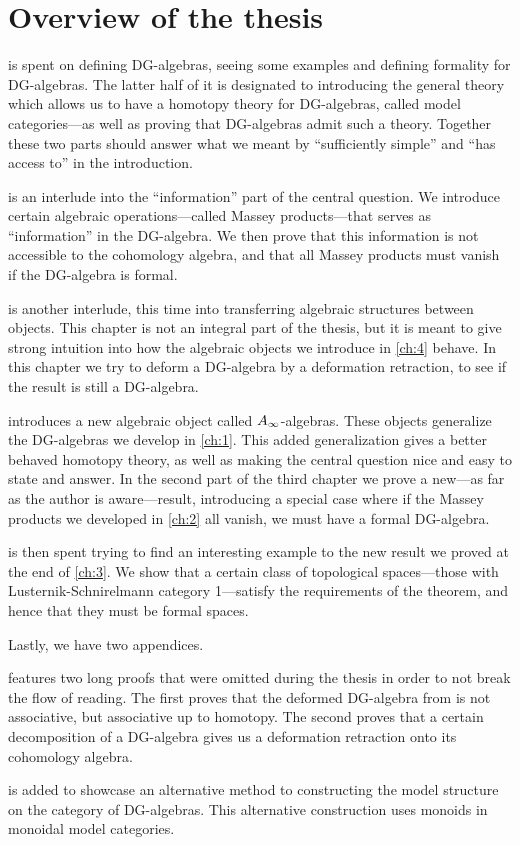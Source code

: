 

\section{Overview of the thesis}

\textit{} is spent on defining DG-algebras, seeing some examples and  defining formality for DG-algebras. The latter half of it is designated to introducing the general theory which allows us to have a homotopy theory for DG-algebras, called model categories---as well as proving that DG-algebras admit such a theory. Together these two parts should answer what we meant by ``sufficiently simple'' and ``has access to'' in the introduction.

\textit{} is an interlude into the ``information'' part of the central question. We introduce certain algebraic operations---called Massey products---that serves as ``information'' in the DG-algebra. We then prove that this information is not accessible to the cohomology algebra, and that all Massey products must vanish if the DG-algebra is formal. 

\textit{} is another interlude, this time into transferring algebraic structures between objects. This chapter is not an integral part of the thesis, but  it is meant to give strong intuition into how the algebraic objects we introduce in \ref{ch:4} behave. In this chapter we try to deform a DG-algebra by a deformation retraction, to see if the result is still a DG-algebra. 

\textit{} introduces a new algebraic object called $A_{\infty}$-algebras. These objects generalize the DG-algebras we develop in \cref{ch:1}. This added generalization gives a better behaved homotopy theory, as well as making the central question nice and easy to state and answer. In the second part of the third chapter we prove a new---as far as the author is aware---result, introducing a special case where if the Massey products we developed in \cref{ch:2} all vanish, we must have a formal DG-algebra. 

\textit{} is then spent trying to find an interesting example to the new result we proved at the end of \cref{ch:3}. We show that a certain class of topological spaces---those with Lusternik-Schnirelmann category 1---satisfy the requirements of the theorem, and hence that they must be formal spaces. 

Lastly, we have two appendices. 

\textit{} features two long proofs that were omitted during the thesis in order to not break the flow of reading. The first proves that the deformed DG-algebra from  is not associative, but associative up to homotopy. The second proves that a certain decomposition of a DG-algebra gives us a deformation retraction onto its cohomology algebra.

\textit{} is added to showcase an alternative method to constructing the model structure on the category of DG-algebras. This alternative construction uses monoids in monoidal model categories. 


